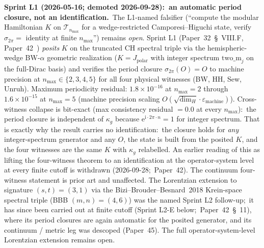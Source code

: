 \documentclass[11pt]{article}
\begin{document}
\textbf{Sprint L1 (2026-05-16; demoted 2026-09-28):\ an automatic
period closure, not an identification.}\ The L1-named falsifier
(``compute the modular Hamiltonian $K$ on $\mathcal{T}_{n_{\max}}$
for a wedge-restricted Camporesi--Higuchi state, verify
$\sigma_{2\pi} = $ identity at finite $n_{\max}$'') remains
\emph{open}.  Sprint L1
(Paper~32~\S~VIII.F, Paper~42~\cite{paper42}) \emph{posits} $K$ on the
truncated CH spectral triple
via the hemispheric-wedge BW-$\alpha$ geometric realization
($K = J_{\mathrm{polar}}$ with integer spectrum $\mathrm{two\_m}_j$
on the full-Dirac basis) and verifies the period closure
$\sigma_{2\pi}(O) = O$ to machine precision at $n_{\max} \in \{2, 3, 4, 5\}$
for all four physical witnesses (BW, HH, Sew, Unruh).  Maximum
periodicity residual: $1.8 \times 10^{-16}$ at $n_{\max}=2$ through
$1.6 \times 10^{-15}$ at $n_{\max}=5$ (machine precision scaling
$O(\sqrt{\dim_H} \cdot \varepsilon_{\mathrm{machine}})$).
Cross-witness collapse is bit-exact (max consistency residual
$= 0.0$ at every $n_{\max}$):\ the period closure is independent
of $\kappa_g$ because $\mathrm{e}^{\mathrm{i}\cdot 2\pi \cdot n} = 1$
for integer spectrum.  That is exactly why the result carries no
identification:\ the closure holds for \emph{any} integer-spectrum
generator and any $O$, the state is built from the posited $K$, and
the four witnesses are the same $K$ with $\kappa_g$ relabelled.  An
earlier reading of this as lifting the four-witness theorem to an
identification at the operator-system level at every finite cutoff is
withdrawn (2026-09-28;\ Paper~42).  The continuum four-witness
statement is prior art and unaffected.
The Lorentzian extension to signature $(s, t) = (3, 1)$ via the
Bizi--Brouder--Besnard~2018 Krein-space spectral triple (BBB
$(m, n) = (4, 6)$) was the named Sprint L2 follow-up;\ it has since been
carried out at finite cutoff (Sprint L2-E below;\ Paper~42~\S~11), where
its period closures are again automatic for the posited generator, and
its continuum / metric leg was descoped (Paper~45).  The full
operator-system-level Lorentzian extension remains open.
\end{document}
